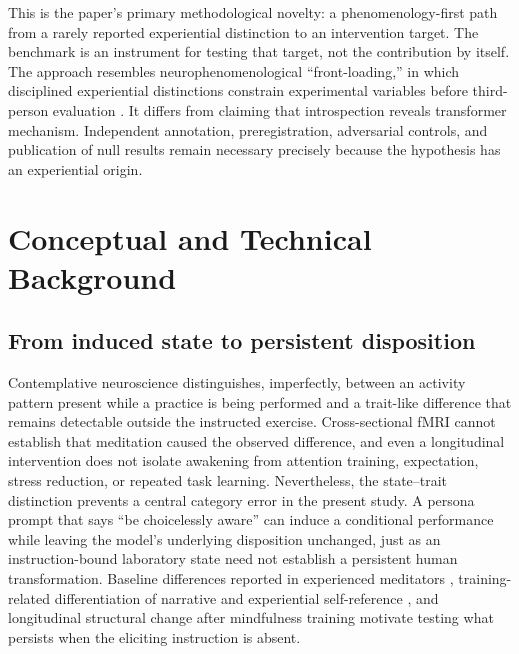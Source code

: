 \documentclass[10pt,twocolumn]{article}
\begin{document}
This is the paper's primary methodological novelty: a phenomenology-first path
from a rarely reported experiential distinction to an intervention target. The
benchmark is an instrument for testing that target, not the contribution by
itself. The approach resembles neurophenomenological ``front-loading,'' in which
disciplined experiential distinctions constrain experimental variables before
third-person evaluation \citep{varela1996neurophenomenology}. It differs from
claiming that introspection reveals transformer mechanism. Independent annotation,
preregistration, adversarial controls, and publication of null results remain
necessary precisely because the hypothesis has an experiential origin.

\section{Conceptual and Technical Background}

\subsection{From induced state to persistent disposition}

Contemplative neuroscience distinguishes, imperfectly, between an activity
pattern present while a practice is being performed and a trait-like difference
that remains detectable outside the instructed exercise. Cross-sectional fMRI
cannot establish that meditation caused the observed difference, and even a
longitudinal intervention does not isolate awakening from attention training,
expectation, stress reduction, or repeated task learning. Nevertheless, the
state--trait distinction prevents a central category error in the present study.
A persona prompt that says ``be choicelessly aware'' can induce a conditional
performance while leaving the model's underlying disposition unchanged, just as
an instruction-bound laboratory state need not establish a persistent human
transformation. Baseline differences reported in experienced meditators
\citep{brewer2011dmn}, training-related differentiation of narrative and
experiential self-reference \citep{farb2007self}, and longitudinal structural
change after mindfulness training \citep{holzel2011gray} motivate testing what
persists when the eliciting instruction is absent.
\end{document}
